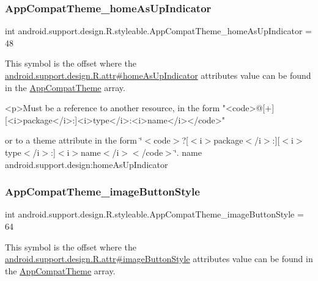 \subsubsection{\texorpdfstring{App\+Compat\+Theme\+\_\+home\+As\+Up\+Indicator}{AppCompatTheme\_homeAsUpIndicator}}
{\footnotesize\ttfamily int android.\+support.\+design.\+R.\+styleable.\+App\+Compat\+Theme\+\_\+home\+As\+Up\+Indicator = 48\hspace{0.3cm}{\ttfamily [static]}}

This symbol is the offset where the \hyperlink{classandroid_1_1support_1_1design_1_1R_1_1attr_acd12fadab5fd0cefc308b364fc46c135}{android.\+support.\+design.\+R.\+attr\#home\+As\+Up\+Indicator} attribute\textquotesingle{}s value can be found in the \hyperlink{classandroid_1_1support_1_1design_1_1R_1_1styleable_afb351dc8de20cbd4c89abe360373010c}{App\+Compat\+Theme} array.

\begin{DoxyVerb}      <p>Must be a reference to another resource, in the form "<code>@[+][<i>package</i>:]<i>type</i>:<i>name</i></code>"
\end{DoxyVerb}
 or to a theme attribute in the form \char`\"{}$<$code$>$?\mbox{[}$<$i$>$package$<$/i$>$\+:\mbox{]}\mbox{[}$<$i$>$type$<$/i$>$\+:\mbox{]}$<$i$>$name$<$/i$>$$<$/code$>$\char`\"{}.  name android.\+support.\+design\+:home\+As\+Up\+Indicator \mbox{\label{classandroid_1_1support_1_1design_1_1R_1_1styleable_ac6d297b6830e11aed44a3f4f6ae32e54}} 
\subsubsection{\texorpdfstring{App\+Compat\+Theme\+\_\+image\+Button\+Style}{AppCompatTheme\_imageButtonStyle}}
{\footnotesize\ttfamily int android.\+support.\+design.\+R.\+styleable.\+App\+Compat\+Theme\+\_\+image\+Button\+Style = 64\hspace{0.3cm}{\ttfamily [static]}}

This symbol is the offset where the \hyperlink{classandroid_1_1support_1_1design_1_1R_1_1attr_ad5ae07572c9491c79516688983b64fab}{android.\+support.\+design.\+R.\+attr\#image\+Button\+Style} attribute\textquotesingle{}s value can be found in the \hyperlink{classandroid_1_1support_1_1design_1_1R_1_1styleable_afb351dc8de20cbd4c89abe360373010c}{App\+Compat\+Theme} array.


